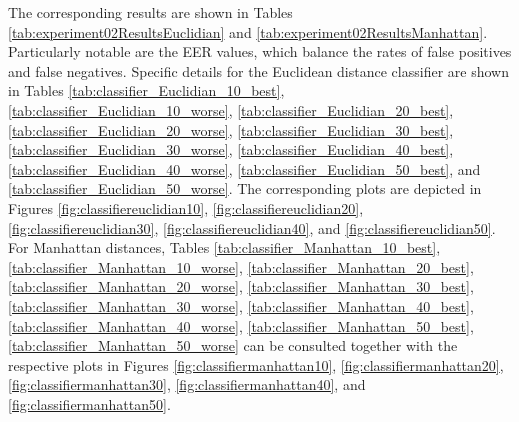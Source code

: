 		
		
		\par The corresponding results are shown in Tables \ref{tab:experiment02ResultsEuclidian} and \ref{tab:experiment02ResultsManhattan}. Particularly notable are the EER values, which balance the rates of false positives and false negatives. Specific details for the Euclidean distance classifier are shown in Tables \ref{tab:classifier_Euclidian_10_best}, \ref{tab:classifier_Euclidian_10_worse},
		\ref{tab:classifier_Euclidian_20_best}, \ref{tab:classifier_Euclidian_20_worse}, 
		\ref{tab:classifier_Euclidian_30_best}, \ref{tab:classifier_Euclidian_30_worse}, 
		\ref{tab:classifier_Euclidian_40_best}, \ref{tab:classifier_Euclidian_40_worse}, 
		\ref{tab:classifier_Euclidian_50_best},  and \ref{tab:classifier_Euclidian_50_worse}. The corresponding plots are depicted in Figures \ref{fig:classifiereuclidian10}, \ref{fig:classifiereuclidian20}, \ref{fig:classifiereuclidian30}, \ref{fig:classifiereuclidian40}, and \ref{fig:classifiereuclidian50}. For Manhattan distances,  Tables \ref{tab:classifier_Manhattan_10_best}, \ref{tab:classifier_Manhattan_10_worse}, 
		\ref{tab:classifier_Manhattan_20_best}, \ref{tab:classifier_Manhattan_20_worse}, 
		\ref{tab:classifier_Manhattan_30_best}, \ref{tab:classifier_Manhattan_30_worse}, 
		\ref{tab:classifier_Manhattan_40_best}, \ref{tab:classifier_Manhattan_40_worse}, 
		\ref{tab:classifier_Manhattan_50_best},
		\ref{tab:classifier_Manhattan_50_worse} 
		can be consulted together with the respective plots in Figures \ref{fig:classifiermanhattan10}, \ref{fig:classifiermanhattan20}, \ref{fig:classifiermanhattan30}, \ref{fig:classifiermanhattan40}, and \ref{fig:classifiermanhattan50}.
	
		
		
		
		
		
		
		
		
		
		
		\FloatBarrier

